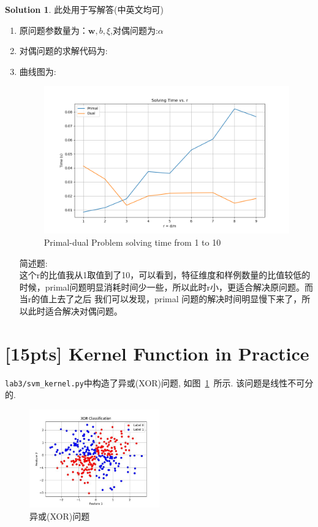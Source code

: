 \documentclass[a4paper,UTF8]{article}
\numberwithin{equation}{section}
\theoremstyle{definition}
\newtheorem*{solution}{Solution}
\newcommand{\vct}[1]{\boldsymbol{#1}} %
\newcommand{\vw}{\vct{w}}
\begin{document}
\begin{solution}
    此处用于写解答(中英文均可)
    \begin{enumerate}
        \item[(1)] 原问题参数量为：$\vw,b,\xi$,对偶问题为:$\alpha$
        \item[(2)] 对偶问题的求解代码为:
        
        \item[(3)] 曲线图为:
        \begin{figure}[h]
            \centering
            \includegraphics[width=1\linewidth]{Primal-dual Problem solving time from 1 to 10.png}
            \caption{Primal-dual Problem solving time from 1 to 10}
        \end{figure}
        
        简述题:\\
        这个r的比值我从1取值到了10，可以看到，特征维度和样例数量的比值较低的时候，primal问题明显消耗时间少一些，所以此时r小，更适合解决原问题。而当r的值上去了之后
        我们可以发现，primal 问题的解决时间明显慢下来了，所以此时适合解决对偶问题。
    \end{enumerate}
\end{solution}

\newpage

\section{[15pts] Kernel Function in Practice}

\texttt{lab3/svm\_kernel.py}中构造了异或(XOR)问题, 如图~\ref{xor}~所示. 该问题是线性不可分的.
\begin{figure}[h]
    \centering
    \includegraphics[width=0.5\textwidth]{lab3/XOR_data.jpg}
    \caption{异或(XOR)问题}
    \label{xor}
\end{figure}
\end{document}
